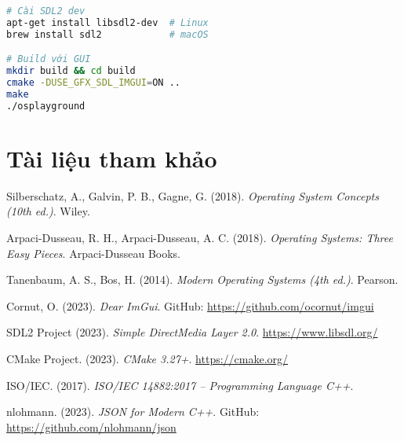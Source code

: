 \documentclass[12pt,a4paper]{report}
\begin{document}
\begin{lstlisting}[language=bash]
# Cài SDL2 dev
apt-get install libsdl2-dev  # Linux
brew install sdl2            # macOS

# Build với GUI
mkdir build && cd build
cmake -DUSE_GFX_SDL_IMGUI=ON ..
make
./osplayground
\end{lstlisting}

\chapter{Tài liệu tham khảo}

\begin{thebibliography}{9}

Silberschatz, A., Galvin, P. B., Gagne, G. (2018). 
\textit{Operating System Concepts (10th ed.)}. 
Wiley.

Arpaci-Dusseau, R. H., Arpaci-Dusseau, A. C. (2018). 
\textit{Operating Systems: Three Easy Pieces}. 
Arpaci-Dusseau Books.

Tanenbaum, A. S., Bos, H. (2014). 
\textit{Modern Operating Systems (4th ed.)}. 
Pearson.

Cornut, O. (2023). 
\textit{Dear ImGui}. 
GitHub: \url{https://github.com/ocornut/imgui}

SDL2 Project (2023).
\textit{Simple DirectMedia Layer 2.0}.
\url{https://www.libsdl.org/}

CMake Project. (2023).
\textit{CMake 3.27+}.
\url{https://cmake.org/}

ISO/IEC. (2017).
\textit{ISO/IEC 14882:2017 – Programming Language C++}.

nlohmann. (2023).
\textit{JSON for Modern C++}.
GitHub: \url{https://github.com/nlohmann/json}

\end{thebibliography}

\end{document}
